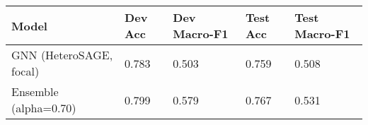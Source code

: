 \begin{tabular}{lllll}
\toprule
Model & Dev Acc & Dev Macro-F1 & Test Acc & Test Macro-F1 \\
\midrule
GNN (HeteroSAGE, focal) & 0.783 & 0.503 & 0.759 & 0.508 \\
Ensemble (alpha=0.70) & 0.799 & 0.579 & 0.767 & 0.531 \\
\bottomrule
\end{tabular}
